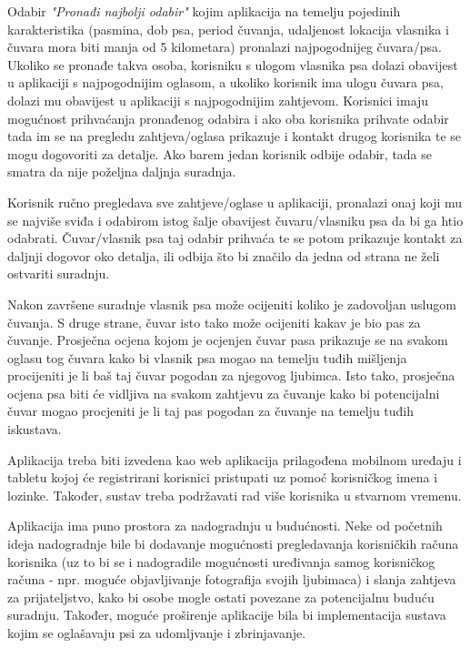 		\begin{packed_item}
			
			\item Odabir \textit{"Pronađi najbolji odabir"} kojim aplikacija na temelju pojedinih karakteristika (pasmina, dob psa, period čuvanja, udaljenost lokacija vlasnika i čuvara mora biti manja od 5 kilometara) pronalazi najpogodnijeg čuvara/psa. Ukoliko se pronađe takva osoba, korisniku s ulogom vlasnika psa dolazi obavijest u aplikaciji s najpogodnijim oglasom, a ukoliko korisnik ima ulogu čuvara psa, dolazi mu obavijest u aplikaciji s najpogodnijim zahtjevom. Korisnici imaju mogućnost prihvaćanja pronađenog odabira i ako oba korisnika prihvate odabir tada im se na pregledu zahtjeva/oglasa prikazuje i kontakt drugog korisnika te se mogu dogovoriti za detalje. Ako barem jedan korisnik odbije odabir, tada se smatra da nije poželjna daljnja suradnja.
			\item Korisnik ručno pregledava sve zahtjeve/oglase u aplikaciji, pronalazi onaj koji mu se najviše sviđa i odabirom istog šalje obavijest čuvaru/vlasniku psa da bi ga htio odabrati. Čuvar/vlasnik psa taj odabir prihvaća te se potom prikazuje kontakt za daljnji dogovor oko detalja, ili odbija što bi značilo da jedna od strana ne želi ostvariti suradnju.
			
		\end{packed_item}
		
		Nakon završene suradnje  vlasnik psa može ocijeniti koliko je zadovoljan uslugom čuvanja. S druge strane, čuvar isto tako može ocijeniti kakav je bio pas za čuvanje. Prosječna ocjena kojom je ocjenjen čuvar pasa prikazuje se na svakom oglasu tog čuvara kako bi vlasnik psa mogao na temelju tuđih mišljenja procijeniti je li baš taj čuvar pogodan za njegovog ljubimca. Isto tako, prosječna ocjena psa biti će vidljiva na svakom zahtjevu za čuvanje kako bi potencijalni čuvar mogao procjeniti je li taj pas pogodan za čuvanje na temelju tuđih iskustava.
		
		Aplikacija treba biti izvedena kao web aplikacija prilagođena mobilnom uređaju i tabletu kojoj će registrirani korisnici pristupati uz pomoć korisničkog imena i lozinke. Također, sustav treba podržavati rad više korisnika u stvarnom vremenu.\newline
		
		
		
		Aplikacija ima puno prostora za nadogradnju u budućnosti. Neke od početnih ideja nadogradnje bile bi 
		dodavanje mogućnosti pregledavanja korisničkih računa korisnika (uz to bi se i nadogradile mogućnosti uređivanja samog korisničkog računa - npr. moguće objavljivanje fotografija svojih ljubimaca) i slanja zahtjeva za prijateljstvo, kako bi osobe mogle ostati povezane za potencijalnu buduću suradnju. Također, moguće proširenje aplikacije bila bi implementacija sustava kojim se oglašavaju psi za udomljvanje i zbrinjavanje.\newline
		
